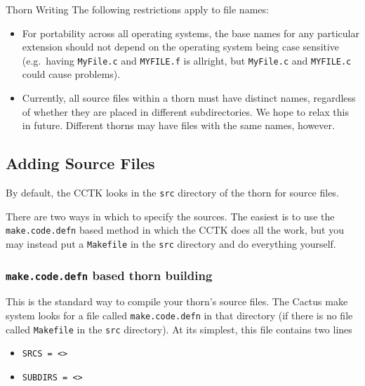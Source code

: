 \begin{cactuspart}{Thorn Writing}
The following restrictions apply to file names:
\begin{itemize}
\item For portability across all operating systems, the base names
        for any particular extension should not depend on the operating
        system being case sensitive (e.g.\ having \texttt{MyFile.c} and
        \texttt{MYFILE.f} is allright, but \texttt{MyFile.c} and
	\texttt{MYFILE.c} could cause problems).
\item Currently, all source files within a thorn must have distinct names,
regardless of whether they are placed in different subdirectories.  We hope
to relax this in future.  Different thorns may have files with the same names,
however.
\end{itemize}


\subsection{Adding Source Files}

By default, the CCTK looks in the \texttt{src} directory of the thorn for source
files.

There are two ways in which to specify the sources.  The easiest is to use the
\texttt{make.code.defn} based method in which the CCTK does all the work, but you
may instead put a \texttt{Makefile} in the \texttt{src} directory and do everything
yourself.

\subsubsection{\texttt{make.code.defn} based thorn building}
\label{sec:mabathbu}

This is the standard way to compile your thorn's source files.
The Cactus make system looks for a file called \texttt{make.code.defn} in that
directory (if there is no file called \texttt{Makefile} in the \texttt{src} directory).  At its simplest, this file contains two lines

\begin{itemize}
\item \texttt{SRCS = <>}

\item \texttt{SUBDIRS = <>}


\end{itemize}
\end{cactuspart}
